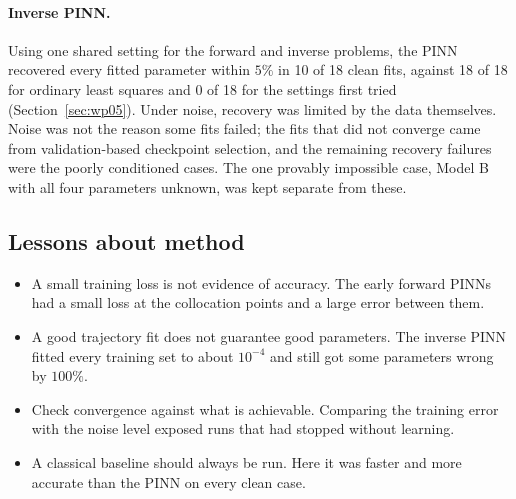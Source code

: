 \paragraph{Inverse PINN.} Using one shared setting for the forward and inverse problems, the PINN recovered every fitted parameter within $5\%$ in 10 of 18 clean fits, against 18 of 18 for ordinary least squares and 0 of 18 for the settings first tried (Section~\ref{sec:wp05}). Under noise, recovery was limited by the data themselves. Noise was not the reason some fits failed; the fits that did not converge came from validation-based checkpoint selection, and the remaining recovery failures were the poorly conditioned cases. The one provably impossible case, Model B with all four parameters unknown, was kept separate from these.

\subsection{Lessons about method}
\begin{itemize}
\item A small training loss is not evidence of accuracy. The early forward PINNs had a small loss at the collocation points and a large error between them.
\item A good trajectory fit does not guarantee good parameters. The inverse PINN fitted every training set to about $10^{-4}$ and still got some parameters wrong by $100\%$.
\item Check convergence against what is achievable. Comparing the training error with the noise level exposed runs that had stopped without learning.
\item A classical baseline should always be run. Here it was faster and more accurate than the PINN on every clean case.
\end{itemize}


